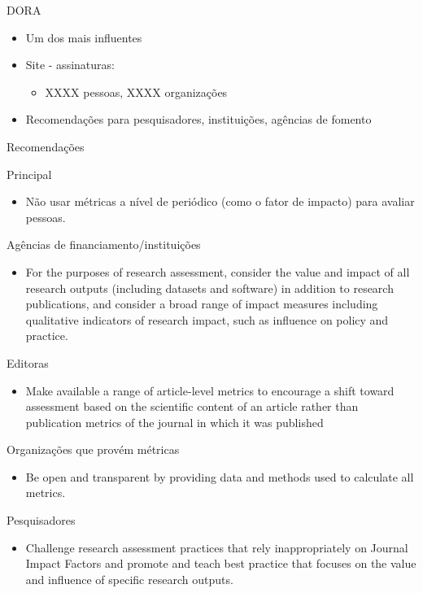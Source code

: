 \documentclass[bigger]{beamer}
\begin{document}
\begin{frame}[label={sec:orgdbec492}]{DORA}
\begin{itemize}
\item Um dos mais influentes
\item Site - assinaturas:
\begin{itemize}
\item XXXX pessoas, XXXX organizações
\end{itemize}
\item Recomendações para pesquisadores, instituições, agências de fomento
\end{itemize}
\end{frame}

\begin{frame}[label={sec:org8305b11}]{Recomendações}
\begin{block}{Principal}
\begin{itemize}
\item Não usar métricas a nível de periódico (como o fator de impacto) para avaliar pessoas.
\end{itemize}
\end{block}

\begin{block}{Agências de financiamento/instituições}
\begin{itemize}
\item For the purposes of research assessment, consider the value and impact of all research outputs (including datasets and software) in addition to research publications, and consider a broad range of impact measures including qualitative indicators of research impact, such as influence on policy and practice.
\end{itemize}
\end{block}

\begin{block}{Editoras}
\begin{itemize}
\item Make available a range of article-level metrics to encourage a shift toward assessment based on the scientific content of an article rather than publication metrics of the journal in which it was published
\end{itemize}
\end{block}

\begin{block}{Organizações que provém métricas}
\begin{itemize}
\item Be open and transparent by providing data and methods used to calculate all metrics.
\end{itemize}
\end{block}

\begin{block}{Pesquisadores}
\begin{itemize}
\item Challenge research assessment practices that rely inappropriately on Journal Impact Factors and promote and teach best practice that focuses on the value and influence of specific research outputs.
\end{itemize}
\end{block}
\end{frame}
\end{document}
